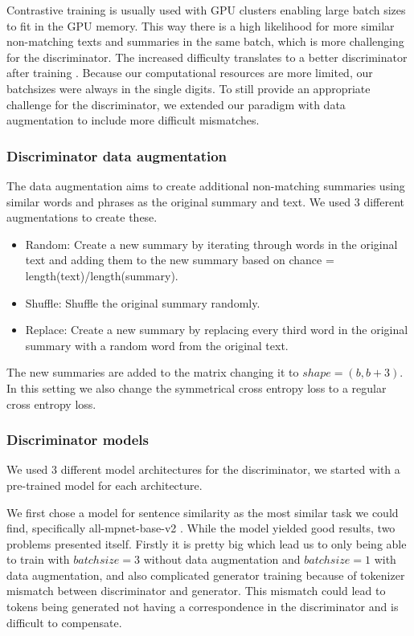 \documentclass[11pt]{article}
\begin{document}
Contrastive training is usually used with GPU clusters enabling large batch sizes to fit in the GPU memory. This way there is a high likelihood for more similar non-matching texts and summaries in the same batch, which is more challenging for the discriminator. The increased difficulty translates to a better discriminator after training \cite{chen2020simple}. Because our computational resources are more limited, our batchsizes were always in the single digits. To still provide an appropriate challenge for the discriminator, we extended our paradigm with data augmentation to include more difficult mismatches. 

\subsubsection{Discriminator data augmentation}

The data augmentation aims to create additional non-matching summaries using similar words and phrases as the original summary and text. We used 3 different augmentations to create these. 

\begin{itemize}
    \item Random: Create a new summary by iterating through words in the original text and adding them to the new summary based on chance = length(text)/length(summary).
    \item Shuffle: Shuffle the original summary randomly.
    \item Replace: Create a new summary by replacing every third word in the original summary with a random word from the original text.
\end{itemize}
The new summaries are added to the matrix changing it to $shape = (b,b+3)$. In this setting we also change the symmetrical cross entropy loss to a regular cross entropy loss.


\subsubsection{Discriminator models}

We used 3 different model architectures for the discriminator, we started with a pre-trained model for each architecture. 

We first chose a model for sentence similarity as the most similar task we could find, specifically 
all-mpnet-base-v2 \cite{mpnet2}. While the model yielded good results, two problems presented itself. Firstly it is pretty big which lead us to only being able to train with $batchsize = 3$ without data augmentation and $batchsize = 1$ with data augmentation, and also complicated generator training because of tokenizer mismatch between discriminator and generator. This mismatch could lead to tokens being generated not having a correspondence in the discriminator and is difficult to compensate. 
\end{document}
